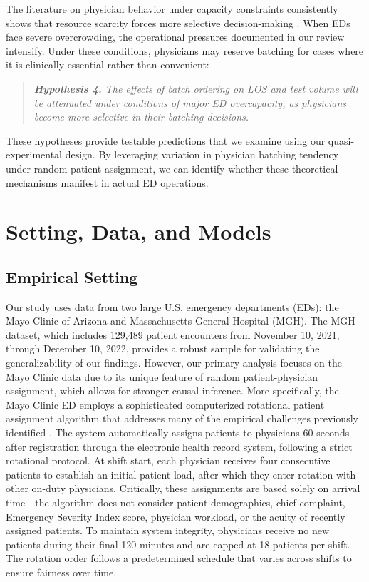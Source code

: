 \documentclass[,,nonblindrev]{informs}
\begin{document}
The literature on physician behavior under capacity constraints
consistently shows that resource scarcity forces more selective
decision-making \citep[\citet{kc2009impact}]{kuntz2014stress}. When EDs
face severe overcrowding, the operational pressures documented in our
review intensify. Under these conditions, physicians may reserve
batching for cases where it is clinically essential rather than
convenient:

\begin{quote}
\small
\textit{\textbf{Hypothesis 4.} The effects of batch ordering on LOS and test volume will be attenuated under conditions of major ED overcapacity, as physicians become more selective in their batching decisions.}
\end{quote}

These hypotheses provide testable predictions that we examine using our
quasi-experimental design. By leveraging variation in physician batching
tendency under random patient assignment, we can identify whether these
theoretical mechanisms manifest in actual ED operations.

\section{Setting, Data, and Models}\label{sec:3}

\subsection{Empirical Setting}\label{sec:4.1}

Our study uses data from two large U.S. emergency departments (EDs): the
Mayo Clinic of Arizona and Massachusetts General Hospital (MGH). The MGH
dataset, which includes 129,489 patient encounters from November 10,
2021, through December 10, 2022, provides a robust sample for validating
the generalizability of our findings. However, our primary analysis
focuses on the Mayo Clinic data due to its unique feature of random
patient-physician assignment, which allows for stronger causal
inference. More specifically, the Mayo Clinic ED employs a sophisticated
computerized rotational patient assignment algorithm that addresses many
of the empirical challenges previously identified
\citep{Traub2016, traub2016emergency, Traub2018}. The system
automatically assigns patients to physicians 60 seconds after
registration through the electronic health record system, following a
strict rotational protocol. At shift start, each physician receives four
consecutive patients to establish an initial patient load, after which
they enter rotation with other on-duty physicians. Critically, these
assignments are based solely on arrival time---the algorithm does not
consider patient demographics, chief complaint, Emergency Severity Index
score, physician workload, or the acuity of recently assigned patients.
To maintain system integrity, physicians receive no new patients during
their final 120 minutes and are capped at 18 patients per shift. The
rotation order follows a predetermined schedule that varies across
shifts to ensure fairness over time.
\end{document}
